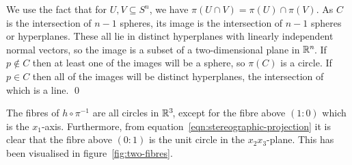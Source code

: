 \proof
We use the fact that for $U, V \subseteq S^n\!$,
we have $\pi(U \cap V) = \pi(U) \cap \pi(V)$.
As $C$ is the intersection of $n - 1$ spheres,
its image is the intersection of $n - 1$ spheres or hyperplanes.
These all lie in distinct hyperplanes with linearly independent normal vectors,
so the image is a subset of a two-dimensional plane in $\mathbb{R}^n\!$.
If $p \notin C$ then at least one of the images will be a sphere,
so $\pi(C)$ is a circle.
If $p \in C$ then all of the images will be distinct hyperplanes,
the intersection of which is a line.
\qed

The fibres of $h \circ \pi^{-1}$ are all circles in $\mathbb{R}^3\!$,
except for the fibre above $(1 : 0)$ which is the $x_1$-axis.
Furthermore, from equation~\ref{eqn:stereographic-projection} it is clear
that the fibre above $(0 : 1)$ is the unit circle in the $x_2 x_3$-plane.
This has been visualised in figure~\ref{fig:two-fibres}.

